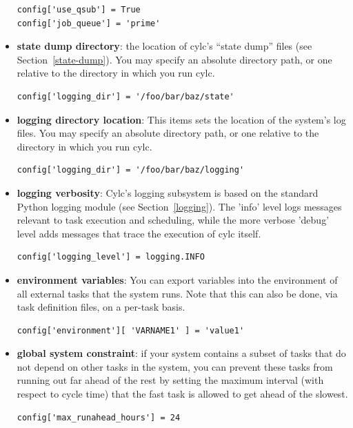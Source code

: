 \documentclass[11pt,a4paper]{article}
\begin{document}
\begin{itemize}
        \begin{lstlisting}
config['use_qsub'] = True
config['job_queue'] = 'prime'
        \end{lstlisting}

    \item {\bf state dump directory}: the location of cylc's ``state
        dump'' files (see Section~\ref{state-dump}).  You may
        specify an absolute directory path, or one relative to the
        directory in which you run cylc.
        
        \begin{lstlisting}
config['logging_dir'] = '/foo/bar/baz/state'
        \end{lstlisting}


    \item {\bf logging directory location}: 
        This items sets the location of the system's log files. You may
        specify an absolute directory path, or one relative to the
        directory in which you run cylc.

        \begin{lstlisting}
config['logging_dir'] = '/foo/bar/baz/logging'
        \end{lstlisting}

    \item {\bf logging verbosity}: Cylc's logging subsystem is based on
        the standard Python logging module (see
        Section~\ref{logging}). The 'info' level logs messages
        relevant to task execution and scheduling, while the more
        verbose 'debug' level adds messages that trace the execution of
        cylc itself.

        \begin{lstlisting}
config['logging_level'] = logging.INFO
        \end{lstlisting}

    \item {\bf environment variables}: You can export variables into the 
        environment of all external tasks that the system runs. Note that
        this can also be done, via task definition files, on a per-task
        basis.

        \begin{lstlisting}
config['environment'][ 'VARNAME1' ] = 'value1'
        \end{lstlisting}

    \item {\bf global system constraint}: if your system contains a
        subset of tasks that do not depend on other tasks in the system, 
        you can prevent these tasks from running out far ahead of the 
        rest by setting the maximum interval (with respect to cycle
        time) that the fast task is allowed to get ahead of the slowest.
        
        \begin{lstlisting}
config['max_runahead_hours'] = 24
        \end{lstlisting}

\end{itemize}
\end{document}

